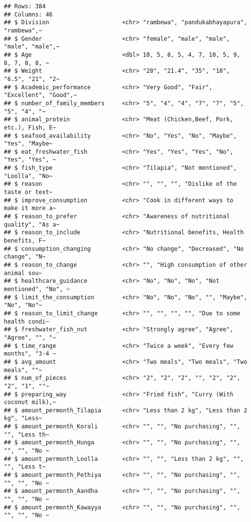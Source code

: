 \documentclass[
]{article}
\begin{document}
\begin{verbatim}
## Rows: 384
## Columns: 46
## $ Division                     <chr> "rambewa", "pandukabhayapura", "rambewa",~
## $ Gender                       <chr> "female", "male", "male", "male", "male",~
## $ Age                          <dbl> 10, 5, 8, 5, 4, 7, 10, 5, 9, 8, 7, 8, 8, ~
## $ Weight                       <chr> "28", "21.4", "35", "18", "6.5", "21", "2~
## $ Academic_performance         <chr> "Very Good", "Fair", "Excellent", "Good",~
## $ number_of_family_members     <chr> "5", "4", "4", "7", "7", "5", "5", "4", "~
## $ animal_protein               <chr> "Meat (Chicken,Beef, Pork, etc.), Fish, E~
## $ seafood_availability         <chr> "No", "Yes", "No", "Maybe", "Yes", "Maybe~
## $ eat_freshwater_fish          <chr> "Yes", "Yes", "Yes", "No", "Yes", "Yes", ~
## $ fish_type                    <chr> "Tilapia", "Not mentioned", "Loolla", "No~
## $ reason                       <chr> "", "", "", "Dislike of the taste or text~
## $ improve_consumption          <chr> "Cook in different ways to make it more a~
## $ reason_to_prefer             <chr> "Awareness of nutritional quality", "As a~
## $ reason_to_include            <chr> "Nutritional benefits, Health benefits, F~
## $ consumption_changing         <chr> "No change", "Decreased", "No change", "N~
## $ reason_to_change             <chr> "", "High consumption of other animal sou~
## $ healthcare_guidance          <chr> "No", "No", "No", "Not mentioned", "No", ~
## $ limit_the_consumption        <chr> "No", "No", "No", "", "Maybe", "No", "No"~
## $ reason_to_limit_change       <chr> "", "", "", "", "Due to some health condi~
## $ freshwater_fish_nut          <chr> "Strongly agree", "Agree", "Agree", "", "~
## $ time_range                   <chr> "Twice a week", "Every few months", "3-4 ~
## $ avg_amount                   <chr> "Two meals", "Two meals", "Two meals", ""~
## $ num_of_pieces                <chr> "2", "2", "2", "", "2", "2", "2", "1", ""~
## $ preparing_way                <chr> "Fried fish", "Curry (With coconut milk),~
## $ amount_permonth_Tilapia      <chr> "Less than 2 kg", "Less than 2 kg", "Less~
## $ amount_permonth_Korali       <chr> "", "", "No purchasing", "", "", "Less th~
## $ amount_permonth_Hunga        <chr> "", "", "No purchasing", "", "", "", "No ~
## $ amount_permonth_Loolla       <chr> "", "", "Less than 2 kg", "", "", "Less t~
## $ amount_permonth_Pethiya      <chr> "", "", "No purchasing", "", "", "", "No ~
## $ amount_permonth_Aandha       <chr> "", "", "No purchasing", "", "", "", "No ~
## $ amount_permonth_Kawayya      <chr> "", "", "No purchasing", "", "", "", "No ~

\end{verbatim}
\end{document}
